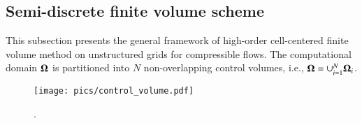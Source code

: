 \subsection{Semi-discrete finite volume scheme}
\label{ssec:FV}

This subsection presents the general framework of high-order cell-centered finite volume method on unstructured grids for compressible flows.
The computational domain $\mathbf{\Omega}$ is partitioned into $N$ non-overlapping control volumes, i.e., $\mathbf{\Omega}= \cup^N_{i=1}{\mathbf{\Omega}_i}$.  
\begin{figure}[htbp!]
    \centering
    \texttt{[image: pics/control\_volume.pdf]}
    \caption{.}
    \label{fig:controlvolume}
\end{figure}


